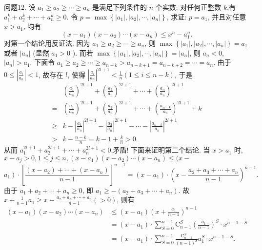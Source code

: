 问题12. 设 $a_1 \geqslant a_2 \geqslant \cdots \geqslant a_n$ 是满足下列条件的 $n$ 个实数: 对任何正整数 $k$,有 $a_1^k+a_2^k+\cdots+a_n^k \geqslant 0$. 令 $p=\max \left\{\left|a_1\right|,\left|a_2\right|, \cdots,\left|a_n\right|\right\}$, 求证: $p= a_1$, 并且对任意 $x>a_1$, 均有
$$
\left(x-a_1\right)\left(x-a_2\right) \cdots\left(x-a_n\right) \leqslant x^n-a_1^n .
$$
对第一个结论用反证法.
因为 $a_1 \geqslant a_2 \geqslant \cdots \geqslant a_n$, 则 $\max \left\{\left|a_1\right|,\left|a_2\right|, \cdots,\left|a_n\right|\right\}=a_1$ 或者 $\left|a_n\right|$ (显然 $a_1>0$ ). 而若 $\max \left\{\left|a_1\right|,\left|a_2\right|, \cdots,\left|a_n\right|\right\}=\left|a_n\right|$, 则 $a_n<0$, $\left|a_n\right|>a_1$.
下面令 $a_1 \geqslant a_2 \geqslant \cdots \geqslant a_{n-k}>a_{n-k+1}=a_{n-k+2}=\cdots=a_n$.
由于 $0 \leqslant\left|\frac{a_i}{a_n}\right|<1$, 故存在 $l$, 使得 $\left|\frac{a_i}{a_n}\right|^{2 l+1}<\frac{1}{n}(1 \leqslant i \leqslant n-k)$, 于是
$$
\begin{aligned}
& \left(\frac{a_1}{a_n}\right)^{2 l+1}+\left(\frac{a_2}{a_n}\right)^{2 l+1}+\cdots+\left(\frac{a_n}{a_n}\right)^{2 l+1} \\
= & \left(\frac{a_1}{a_n}\right)^{2 l+1}+\left(\frac{a_2}{a_n}\right)^{2 l+1}+\cdots+\left(\frac{a_{n-k}}{a_n}\right)^{2 l+1}+k \\
\geqslant & k-\left|\frac{a_1}{a_n}\right|^{2 l+1}-\left|\frac{a_2}{a_n}\right|^{2 l+1}-\cdots-\left|\frac{a_{n-k}}{a_n}\right|^{2 l+1} \\
> & k-\frac{n-k}{n}=k-1+\frac{k}{n}>0 .
\end{aligned}
$$
从而 $a_1^{2 l+1}+a_2^{2 l+1}+\cdots+a_n^{2 l+1}<0$,矛盾!
下面来证明第二个结论.
当 $x>a_1$ 时, $x-a_j>0,1 \leqslant j \leqslant n,\left(x-a_1\right)\left(x-a_2\right) \cdots\left(x-a_n\right) \leqslant(x-$
$$
\left.a_1\right) \cdot\left[\frac{\left(x-a_2\right)+\cdots+\left(x-a_n\right)}{n-1}\right]^{n-1}=\left(x-a_1\right) \cdot\left(x-\frac{a_2+a_3+\cdots+a_n}{n-1}\right)^{n-1} \text {. }
$$
由于 $a_1+a_2+\cdots+a_n \geqslant 0$, 即 $a_1 \geqslant-\left(a_2+a_3+\cdots+a_n\right)$.
故 $x+\frac{1}{n-1} a_1 \geqslant x-\frac{a_2+a_3+\cdots+a_n}{n-1}(>0)$, 则有
$$
\begin{aligned}
\left(x-a_1\right)\left(x-a_2\right) \cdots\left(x-a_n\right) & \leqslant\left(x-a_1\right)\left(x+\frac{a_1}{n-1}\right)^{n-1} \\
& =\left(x-a_1\right) \cdot \sum_{S=0}^{n-1} \mathrm{C}_{n-1}^S\left(\frac{a_1}{n-1}\right)^S \cdot x^{n-1-S} \\
& =\left(x-a_1\right) \cdot \sum_{S=0}^{n-1} \frac{\mathrm{C}_{n-1}^S}{(n-1)^S} a_1^S \cdot x^{n-1-S} .
\end{aligned}
$$
